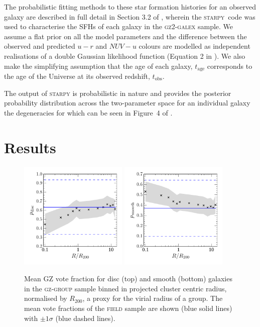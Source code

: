 \documentclass[useAMS,usenatbib]{mn2e}
\def\starpy ~{\textsc{starpy}}
\begin{document}
The probabilistic fitting methods to these star formation histories for an observed galaxy are described in full detail in Section 3.2 of \cite{smethurst15}, wherein the \starpy ~~code was used to characterise the SFHs of each galaxy in the \textsc{gz2-galex} sample. We assume a flat prior on all the model parameters and the difference between the observed and predicted $u-r$ and $NUV-u$ colours are modelled as independent realisations of a double Gaussian likelihood function (Equation 2 in \citealt{smethurst15}). We also make the simplifying assumption that the age of each galaxy, $t_\mathrm{age}$ corresponds to the age of the Universe at its observed redshift, $t_\mathrm{obs}$.

The output of \starpy  ~ is probabilistic in nature and provides the posterior probability distribution across the two-parameter space for an individual galaxy the degeneracies for which can be seen in Figure~4 of \citet{smethurst15}.

\section{Results}\label{sec:results}

\begin{figure}
\includegraphics[width=0.46\textwidth]{p_disc_trend_with_log_radius_field_compare.pdf}
\includegraphics[width=0.46\textwidth]{p_smooth_trend_with_log_radius_field_compare.pdf}
\caption{Mean GZ vote fraction for disc (top) and smooth (bottom) galaxies in the \textsc{gz-group} sample binned in projected cluster centric radius, normalised by $R_{200}$, a proxy for the virial radius of a group. The mean vote fractions of the \textsc{field} sample are shown (blue solid lines) with $\pm1\sigma$ (blue dashed lines).}
\label{fig:morphradius}
\end{figure}
\end{document}
